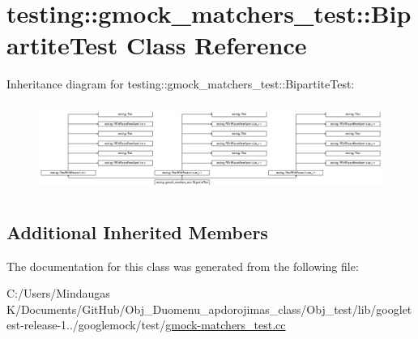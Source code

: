 \hypertarget{classtesting_1_1gmock__matchers__test_1_1_bipartite_test}{}\section{testing\+::gmock\+\_\+matchers\+\_\+test\+::Bipartite\+Test Class Reference}
\label{classtesting_1_1gmock__matchers__test_1_1_bipartite_test}
Inheritance diagram for testing\+::gmock\+\_\+matchers\+\_\+test\+::Bipartite\+Test\+:\begin{figure}[H]
\begin{center}
\leavevmode
\includegraphics[height=2.905318cm]{d0/d16/classtesting_1_1gmock__matchers__test_1_1_bipartite_test}
\end{center}
\end{figure}
\subsection*{Additional Inherited Members}


The documentation for this class was generated from the following file\+:\begin{DoxyCompactItemize}
\item 
C\+:/\+Users/\+Mindaugas K/\+Documents/\+Git\+Hub/\+Obj\+\_\+\+Duomenu\+\_\+apdorojimas\+\_\+class/\+Obj\+\_\+test/lib/googletest-\/release-\/1../googlemock/test/\mbox{\hyperlink{_obj__test_2lib_2googletest-release-1_88_81_2googlemock_2test_2gmock-matchers__test_8cc}{gmock-\/matchers\+\_\+test.\+cc}}\end{DoxyCompactItemize}
